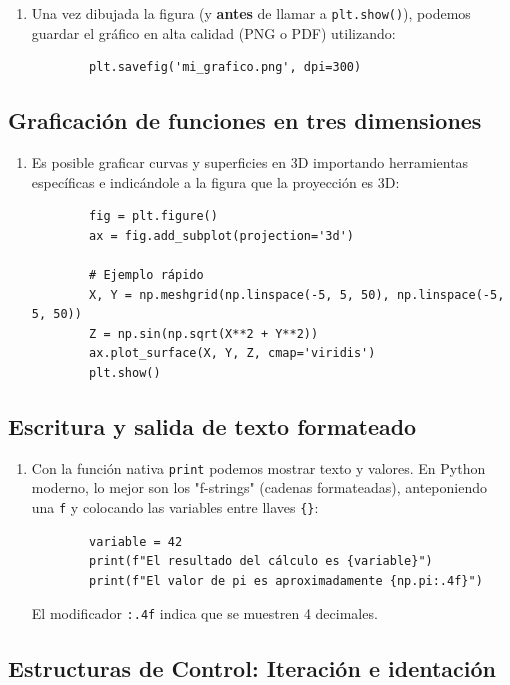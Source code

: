\begin{enumerate}
	\item Una vez dibujada la figura (y \textbf{antes} de llamar a \texttt{plt.show()}), podemos guardar el gráfico en alta calidad (PNG o PDF) utilizando:
	\begin{verbatim}
		plt.savefig('mi_grafico.png', dpi=300)
	\end{verbatim}
\end{enumerate}

\subsection{Graficación de funciones en tres dimensiones}

\begin{enumerate}
	\item Es posible graficar curvas y superficies en 3D importando herramientas específicas e indicándole a la figura que la proyección es 3D:
	\begin{verbatim}
		fig = plt.figure()
		ax = fig.add_subplot(projection='3d')
		
		# Ejemplo rápido
		X, Y = np.meshgrid(np.linspace(-5, 5, 50), np.linspace(-5, 5, 50))
		Z = np.sin(np.sqrt(X**2 + Y**2))
		ax.plot_surface(X, Y, Z, cmap='viridis')
		plt.show()
	\end{verbatim}
\end{enumerate}



\subsection{Escritura y salida de texto formateado}

\begin{enumerate}
	\item Con la función nativa \texttt{print} podemos mostrar texto y valores. En Python moderno, lo mejor son los "f-strings" (cadenas formateadas), anteponiendo una \texttt{f} y colocando las variables entre llaves \texttt{\{\}}:
	\begin{verbatim}
		variable = 42
		print(f"El resultado del cálculo es {variable}")
		print(f"El valor de pi es aproximadamente {np.pi:.4f}")
	\end{verbatim}
	El modificador \texttt{:.4f} indica que se muestren 4 decimales.
\end{enumerate}

\subsection{Estructuras de Control: Iteración e identación}

